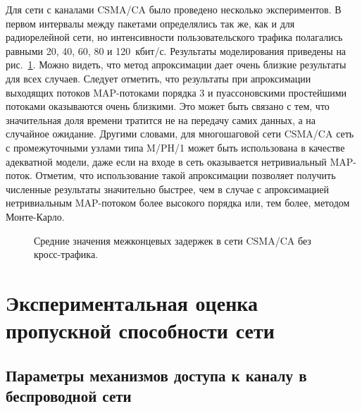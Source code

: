Для сети с каналами CSMA/CA было проведено несколько экспериментов. В первом интервалы между пакетами определялись так же, как и для радиорелейной сети, но интенсивности пользовательского трафика полагались равными 20, 40, 60, 80 и 120~кбит/с. Результаты моделирования приведены на рис.~\ref{fig:ch4_dcf_delays_noct_1}. Можно видеть, что метод апроксимации дает очень близкие результаты для всех случаев. Следует отметить, что результаты при апроксимации выходящих потоков MAP-потоками порядка 3 и пуассоновскими простейшими потоками оказываются очень близкими. Это может быть связано с тем, что значительная доля времени тратится не на передачу самих данных, а на случайное ожидание. Другими словами, для многошаговой сети CSMA/CA сеть с промежуточными узлами типа M/PH/1 может быть использована в качестве адекватной модели, даже если на входе в сеть оказывается нетривиальный MAP-поток. Отметим, что использование такой апроксимации позволяет получить численные результаты значительно быстрее, чем в случае с апроксимацией нетривиальным MAP-потоком более высокого порядка или, тем более, методом Монте-Карло.

\begin{figure}[h]
  \caption{Средние значения межконцевых задержек в сети CSMA/CA без кросс-трафика.}
  \label{fig:ch4_dcf_delays_noct_1}
\end{figure}







\section{Экспериментальная оценка пропускной способности сети}\label{sec:ch4_stand_results}

\subsection{Параметры механизмов доступа к каналу в беспроводной сети}

